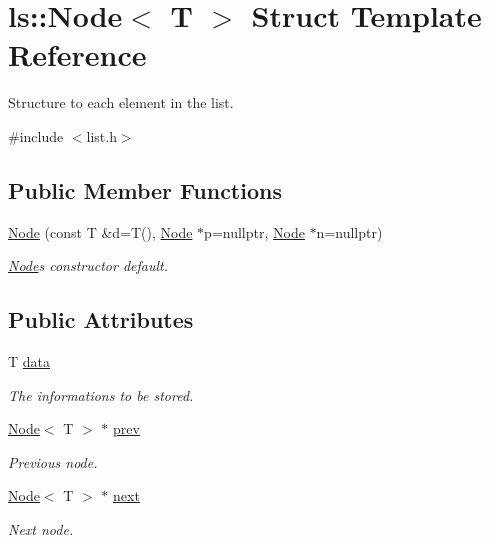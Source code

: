 \hypertarget{structls_1_1Node}{}\section{ls\+:\+:Node$<$ T $>$ Struct Template Reference}
\label{structls_1_1Node}


Structure to each element in the list.  




{\ttfamily \#include $<$list.\+h$>$}

\subsection*{Public Member Functions}
\begin{DoxyCompactItemize}
\item 
\mbox{\label{structls_1_1Node_a9d72765459432e7e6ed9d4774fde5bc9}} 
\hyperlink{structls_1_1Node_a9d72765459432e7e6ed9d4774fde5bc9}{Node} (const T \&d=T(), \hyperlink{structls_1_1Node}{Node} $\ast$p=nullptr, \hyperlink{structls_1_1Node}{Node} $\ast$n=nullptr)
\begin{DoxyCompactList}\small\item\em \hyperlink{structls_1_1Node}{Node}\textquotesingle{}s constructor default. \end{DoxyCompactList}\end{DoxyCompactItemize}
\subsection*{Public Attributes}
\begin{DoxyCompactItemize}
\item 
\mbox{\label{structls_1_1Node_ab1c22709e50c994125d21f1998b3b3b7}} 
T \hyperlink{structls_1_1Node_ab1c22709e50c994125d21f1998b3b3b7}{data}
\begin{DoxyCompactList}\small\item\em The informations to be stored. \end{DoxyCompactList}\item 
\mbox{\label{structls_1_1Node_a36cbf598150b7e4c7708933f78252b65}} 
\hyperlink{structls_1_1Node}{Node}$<$ T $>$ $\ast$ \hyperlink{structls_1_1Node_a36cbf598150b7e4c7708933f78252b65}{prev}
\begin{DoxyCompactList}\small\item\em Previous node. \end{DoxyCompactList}\item 
\mbox{\label{structls_1_1Node_a969a6cf64494340df3bd7136b4e7daca}} 
\hyperlink{structls_1_1Node}{Node}$<$ T $>$ $\ast$ \hyperlink{structls_1_1Node_a969a6cf64494340df3bd7136b4e7daca}{next}
\begin{DoxyCompactList}\small\item\em Next node. \end{DoxyCompactList}\end{DoxyCompactItemize}


